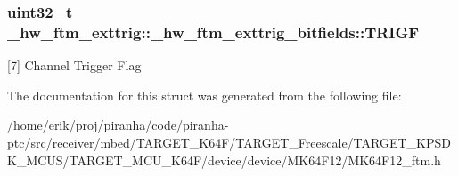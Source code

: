 \subsubsection[{\texorpdfstring{T\+R\+I\+GF}{TRIGF}}]{\setlength{\rightskip}{0pt plus 5cm}uint32\+\_\+t \+\_\+hw\+\_\+ftm\+\_\+exttrig\+::\+\_\+hw\+\_\+ftm\+\_\+exttrig\+\_\+bitfields\+::\+T\+R\+I\+GF}\hypertarget{struct__hw__ftm__exttrig_1_1__hw__ftm__exttrig__bitfields_aa884d45271bbd320abb15bad26f2adaf}{}\label{struct__hw__ftm__exttrig_1_1__hw__ftm__exttrig__bitfields_aa884d45271bbd320abb15bad26f2adaf}
\mbox{[}7\mbox{]} Channel Trigger Flag 

The documentation for this struct was generated from the following file\+:\begin{DoxyCompactItemize}
\item 
/home/erik/proj/piranha/code/piranha-\/ptc/src/receiver/mbed/\+T\+A\+R\+G\+E\+T\+\_\+\+K64\+F/\+T\+A\+R\+G\+E\+T\+\_\+\+Freescale/\+T\+A\+R\+G\+E\+T\+\_\+\+K\+P\+S\+D\+K\+\_\+\+M\+C\+U\+S/\+T\+A\+R\+G\+E\+T\+\_\+\+M\+C\+U\+\_\+\+K64\+F/device/device/\+M\+K64\+F12/M\+K64\+F12\+\_\+ftm.\+h\end{DoxyCompactItemize}
